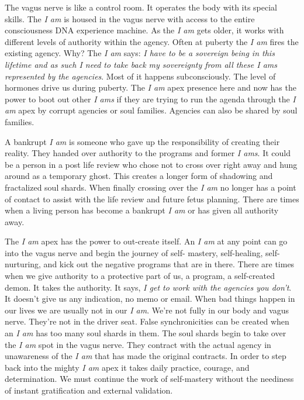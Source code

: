 The vagus nerve is like a control room. It operates the body with its
special skills. The \emph{I am} is housed in the vagus nerve with access
to the entire consciousness DNA experience machine. As the \emph{I am}
gets older, it works with different levels of authority within the
agency. Often at puberty the \emph{I am} fires the existing agency. Why?
The \emph{I am} says: \emph{I have to be a sovereign being in this
lifetime and as such I need to take back my sovereignty from all these I
ams represented by the agencies}. Most of it happens subconsciously. The
level of hormones drive us during puberty. The \emph{I am} apex presence
here and now has the power to boot out other \emph{I ams} if they are
trying to run the agenda through the \emph{I am} apex by corrupt
agencies or soul families. Agencies can also be shared by soul families.

A bankrupt \emph{I am} is someone who gave up the responsibility of
creating their reality. They handed over authority to the programs and
former \emph{I ams}. It could be a person in a post life review who
chose not to cross over right away and hung around as a temporary ghost.
This creates a longer form of shadowing and fractalized soul shards.
When finally crossing over the \emph{I am} no longer has a point of
contact to assist with the life review and future fetus planning. There
are times when a living person has become a bankrupt \emph{I am} or has
given all authority away.

The \emph{I am} apex has the power to out-create itself. An \emph{I am}
at any point can go into the vagus nerve and begin the journey of self-
mastery, self-healing, self-nurturing, and kick out the negative
programs that are in there. There are times when we give authority to a
protective part of us, a program, a self-created demon. It takes the
authority. It says, \emph{I get to work with the agencies you don't}. It
doesn't give us any indication, no memo or email. When bad things happen
in our lives we are usually not in our \emph{I am}. We're not fully in
our body and vagus nerve. They're not in the driver seat. False
synchronicities can be created when an \emph{I am} has too many soul
shards in them. The soul shards begin to take over the \emph{I am} spot
in the vagus nerve. They contract with the actual agency in unawareness
of the \emph{I am} that has made the original contracts. In order to
step back into the mighty \emph{I am} apex it takes daily practice,
courage, and determination. We must continue the work of self-mastery
without the neediness of instant gratification and external validation.

